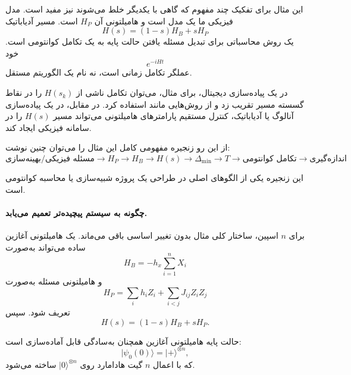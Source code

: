 این مثال برای تفکیک چند مفهوم که گاهی با یکدیگر خلط می‌شوند نیز مفید است. مدل فیزیکی ما یک مدل  است و هامیلتونی آن $H_P$ است. مسیر آدیاباتیک
\begin{equation}
	H(s)=(1-s)H_B+sH_P
\end{equation}
یک روش محاسباتی برای تبدیل مسئله یافتن حالت پایه به یک تکامل کوانتومی است. خود
\begin{equation}
	e^{-iHt}
\end{equation}
عملگر تکامل زمانی است، نه نام یک الگوریتم مستقل.

در یک پیاده‌سازی دیجیتال، برای مثال، می‌توان تکامل ناشی از $H(s_k)$ را در نقاط گسسته مسیر تقریب زد و از روش‌هایی مانند  استفاده کرد. در مقابل، در یک پیاده‌سازی آنالوگ یا آدیاباتیک، کنترل مستقیم پارامترهای هامیلتونی می‌تواند مسیر $H(s)$ را در سامانه فیزیکی ایجاد کند.

از این رو زنجیره مفهومی کامل این مثال را می‌توان چنین نوشت:
\begin{equation}
	\boxed{
		\text{مسئله فیزیکی/بهینه‌سازی}
		\rightarrow
		H_P
		\rightarrow
		H_B
		\rightarrow
		H(s)
		\rightarrow
		\Delta_{\min}
		\rightarrow
		T
		\rightarrow
		\text{تکامل کوانتومی}
		\rightarrow
		\text{اندازه‌گیری}
	}
\end{equation}

این زنجیره یکی از الگوهای اصلی در طراحی یک پروژه شبیه‌سازی یا محاسبه کوانتومی است.

\paragraph{چگونه به سیستم پیچیده‌تر تعمیم می‌یابد.}

برای $n$ اسپین، ساختار کلی مثال بدون تغییر اساسی باقی می‌ماند. یک هامیلتونی آغازین ساده می‌تواند به‌صورت
\begin{equation}
	\label{eq:HB-n}
	H_B=-h_x\sum_{i=1}^{n}X_i
\end{equation}
و هامیلتونی مسئله به‌صورت
\begin{equation}
	\label{eq:HP-n}
	H_P
	=
	\sum_i h_i Z_i
	+
	\sum_{i<j}J_{ij}Z_iZ_j
\end{equation}
تعریف شود. سپس
\begin{equation}
	\label{eq:H-n-interpolation}
	H(s)=(1-s)H_B+sH_P.
\end{equation}

حالت پایه هامیلتونی آغازین همچنان به‌سادگی قابل آماده‌سازی است:
\begin{equation}
	\lvert\psi_0(0)\rangle
	=
	\lvert+\rangle^{\otimes n},
\end{equation}
که با اعمال $n$ گیت هادامارد روی $\lvert0\rangle^{\otimes n}$ ساخته می‌شود.

